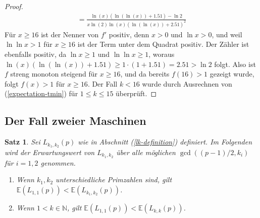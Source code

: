 \documentclass[a4paper, 10pt, ngerman]{article}
\newcommand{\E}{\mathbb{E}}
\newcommand{\N}{\mathbb{N}}
\newtheorem{theorem}{Satz}
\begin{document}
\begin{proof}
\begin{align*}
            = \frac {\ln (x)(\ln (\ln (x)) + 1.51) - \ln 2}
            {x \ln (2) \ln (x)(\ln(\ln(x)) + 2.51)^2}
        \end{align*}
        Für $x \ge 16$ ist der Nenner von $f'$ positiv, denn $x > 0$ und $\ln x > 0$, und weil $\ln \ln x > 1$ für $x \ge 16$ ist der Term unter dem Quadrat positiv. Der Zähler ist ebenfalls positiv, da $\ln x \ge 1$ und $\ln \ln x \ge 1$, woraus $\ln(x)(\ln(\ln(x)) + 1.51) \ge 1 \cdot (1 + 1.51) = 2.51 > \ln 2$ folgt. Also ist $f$ streng monoton steigend für $x \ge 16$, und da bereits $f(16) > 1$ gezeigt wurde, folgt $f(x) > 1$ für $x \ge 16$. Der Fall $k < 16$ wurde durch Ausrechnen von (\ref{expectation-tmin}) für $1 \le k \le 15$ überprüft.
    \end{proof}

    \subsection{Der Fall zweier Maschinen}

    \begin{theorem}
        \label{theorem:optimal-k-m2}
        Sei $L_{k_1, k_2}(p)$ wie in Abschnitt (\ref{lk-definition}) definiert. Im Folgenden wird der Erwartungswert von $L_{k_1, k_2}$ über alle möglichen $\gcd((p - 1)/2, k_i)$ für $i = 1, 2$ genommen.
        \begin{enumerate}
            \item Wenn $k_1, k_2$ unterschiedliche Primzahlen sind, gilt $\E(L_{1, 1}(p)) < \E(L_{k_1, k_2}(p))$.
            \item Wenn $1 < k \in \N$, gilt $\E(L_{1, 1}(p)) < \E(L_{k, k}(p))$.
        \end{enumerate}
    \end{theorem}
\end{document}

